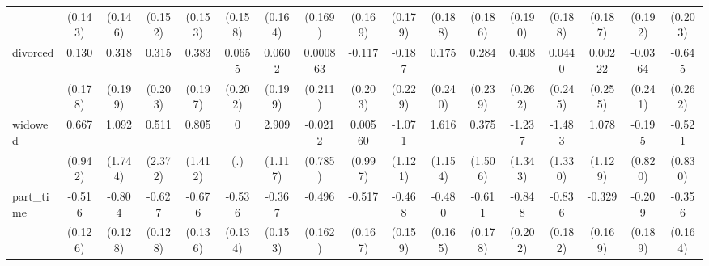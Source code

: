 {\begin{tabular}{l*{16}{c}}
                    &     (0.143)         &     (0.146)         &     (0.152)         &     (0.153)         &     (0.158)         &     (0.164)         &     (0.169)         &     (0.169)         &     (0.179)         &     (0.188)         &     (0.186)         &     (0.190)         &     (0.188)         &     (0.187)         &     (0.192)         &     (0.203)         \\
[1em]
divorced            &       0.130         &       0.318         &       0.315         &       0.383         &      0.0655         &      0.0602         &    0.000863         &      -0.117         &      -0.187         &       0.175         &       0.284         &       0.408         &      0.0440         &     0.00222         &     -0.0364         &      -0.645\sym{*}  \\
                    &     (0.178)         &     (0.199)         &     (0.203)         &     (0.197)         &     (0.202)         &     (0.199)         &     (0.211)         &     (0.203)         &     (0.229)         &     (0.240)         &     (0.239)         &     (0.262)         &     (0.245)         &     (0.255)         &     (0.241)         &     (0.262)         \\
[1em]
widowed             &       0.667         &       1.092         &       0.511         &       0.805         &           0         &       2.909\sym{**} &     -0.0212         &     0.00560         &      -1.071         &       1.616         &       0.375         &      -1.237         &      -1.483         &       1.078         &      -0.195         &      -0.521         \\
                    &     (0.942)         &     (1.744)         &     (2.372)         &     (1.412)         &         (.)         &     (1.117)         &     (0.785)         &     (0.997)         &     (1.121)         &     (1.154)         &     (1.506)         &     (1.343)         &     (1.330)         &     (1.129)         &     (0.820)         &     (0.830)         \\
[1em]
part\_time           &      -0.516\sym{***}&      -0.804\sym{***}&      -0.627\sym{***}&      -0.676\sym{***}&      -0.536\sym{***}&      -0.367\sym{*}  &      -0.496\sym{**} &      -0.517\sym{**} &      -0.468\sym{**} &      -0.480\sym{**} &      -0.611\sym{***}&      -0.848\sym{***}&      -0.836\sym{***}&      -0.329         &      -0.209         &      -0.356\sym{*}  \\
                    &     (0.126)         &     (0.128)         &     (0.128)         &     (0.136)         &     (0.134)         &     (0.153)         &     (0.162)         &     (0.167)         &     (0.159)         &     (0.165)         &     (0.178)         &     (0.202)         &     (0.182)         &     (0.169)         &     (0.189)         &     (0.164)         \\

\end{tabular}}
